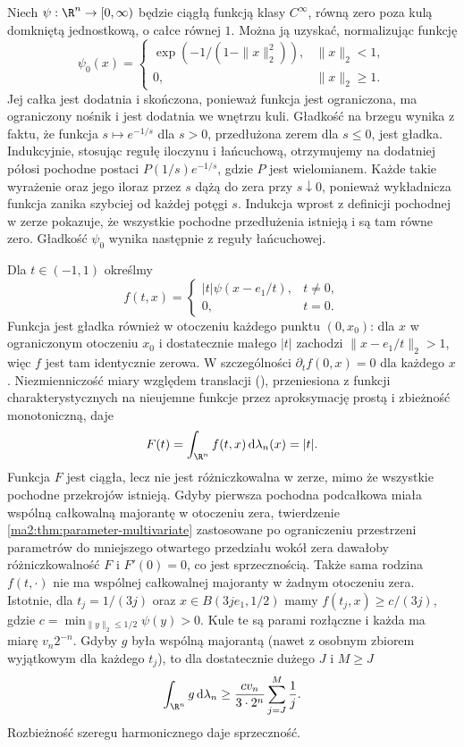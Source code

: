 \begin{przyklad}
\label{ma2:ex:parameter-escape-derivative}
Niech $\psi:\R^n\to[0,\infty)$ będzie ciągłą
funkcją klasy $C^\infty$, równą zero poza kulą
domkniętą jednostkową, o całce równej $1$.
Można ją uzyskać, normalizując funkcję
\[
 \psi_0(x)=
 \begin{cases}
 \exp(-1/(1-\|x\|_2^2)),&\|x\|_2<1,\\
 0,&\|x\|_2\ge1.
 \end{cases}
\]
Jej całka jest dodatnia i skończona, ponieważ
funkcja jest ograniczona, ma ograniczony nośnik
i jest dodatnia we wnętrzu kuli.
Gładkość na brzegu wynika z faktu, że funkcja
$s\mapsto e^{-1/s}$ dla $s>0$, przedłużona zerem
dla $s\le0$, jest gładka. Indukcyjnie, stosując
regułę iloczynu i łańcuchową, otrzymujemy na
dodatniej półosi pochodne postaci $P(1/s)e^{-1/s}$,
gdzie $P$ jest wielomianem. Każde takie wyrażenie
oraz jego iloraz przez $s$ dążą do zera przy
$s\downarrow0$, ponieważ wykładnicza funkcja
zanika szybciej od każdej potęgi $s$.
Indukcja wprost z definicji pochodnej w zerze
pokazuje, że wszystkie pochodne przedłużenia
istnieją i są tam równe zero. Gładkość $\psi_0$
wynika następnie z reguły łańcuchowej.

Dla $t\in(-1,1)$ określmy
\[
 f(t,x)=
 \begin{cases}
 |t|\psi(x-e_1/t),&t\ne0,\\
 0,&t=0.
 \end{cases}
\]
Funkcja jest gładka również w otoczeniu każdego
punktu $(0,x_0)$: dla $x$ w ograniczonym otoczeniu
$x_0$ i dostatecznie małego $|t|$ zachodzi
$\|x-e_1/t\|_2>1$, więc $f$ jest tam identycznie
zerowa. W szczególności $\partial_t f(0,x)=0$
dla każdego $x$.
Niezmienniczość miary względem translacji
(),
przeniesiona z funkcji charakterystycznych na
nieujemne funkcje przez aproksymację prostą
i zbieżność monotoniczną, daje
\[
 F(t)=\int_{\R^n}f(t,x)\,\mathrm d\lambda_n(x)=|t|.
\]
Funkcja $F$ jest ciągła, lecz nie jest
różniczkowalna w zerze, mimo że wszystkie
pochodne przekrojów istnieją.
Gdyby pierwsza pochodna podcałkowa miała
wspólną całkowalną majorantę w otoczeniu zera,
twierdzenie \ref{ma2:thm:parameter-multivariate}
zastosowane po ograniczeniu przestrzeni parametrów
do mniejszego otwartego przedziału wokół zera
dawałoby różniczkowalność $F$ i $F'(0)=0$,
co jest sprzecznością.
Także sama rodzina $f(t,\cdot)$ nie ma wspólnej
całkowalnej majoranty w żadnym otoczeniu zera.
Istotnie, dla $t_j=1/(3j)$ oraz
$x\in B(3je_1,1/2)$ mamy $f(t_j,x)\ge c/(3j)$,
gdzie $c=\min_{\|y\|_2\le1/2}\psi(y)>0$.
Kule te są parami rozłączne i każda ma miarę
$v_n2^{-n}$. Gdyby $g$ była wspólną majorantą
(nawet z osobnym zbiorem wyjątkowym dla każdego
$t_j$), to dla dostatecznie dużego $J$ i $M\ge J$
\[
 \int_{\R^n}g\,\mathrm d\lambda_n
 \ge \frac{cv_n}{3\cdot 2^n}\sum_{j=J}^M\frac1j.
\]
Rozbieżność szeregu harmonicznego daje sprzeczność.
\end{przyklad}

